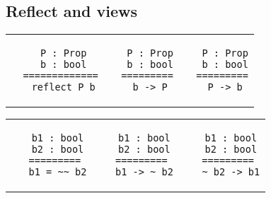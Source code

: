 \begin{landscape}
\begin{small}
\begin{multicols*}{3}[\begin{center}\section*{}\end{center}]

\subsection*{Reflect and views}


  \begin{tabular}{c@{$\to$}cc}
  \begin{minipage}{0.12\textwidth}\begin{lstlisting}
   P : Prop
   b : bool
  =============
   reflect P b
  \end{lstlisting}\end{minipage}
  &
  \begin{minipage}{0.10\textwidth}\begin{lstlisting}
   P : Prop
   b : bool
  =========
   b -> P
  \end{lstlisting}\end{minipage}
  &
  \begin{minipage}{0.10\textwidth}\begin{lstlisting}
   P : Prop
   b : bool
  =========
   P -> b
  \end{lstlisting}\end{minipage}
  \end{tabular}


  \begin{tabular}{c@{$\to$}cc}
  \begin{minipage}{0.10\textwidth}\begin{lstlisting}
   b1 : bool
   b2 : bool
  =========
   b1 = ~~ b2
  \end{lstlisting}\end{minipage}
  &
  \begin{minipage}{0.10\textwidth}\begin{lstlisting}
   b1 : bool
   b2 : bool
  =========
   b1 -> ~ b2
  \end{lstlisting}\end{minipage}
  &
  \begin{minipage}{0.10\textwidth}\begin{lstlisting}
   b1 : bool
   b2 : bool
  =========
   ~ b2 -> b1
  \end{lstlisting}\end{minipage}
  \end{tabular}


\end{multicols*}
\end{small}
\end{landscape}
